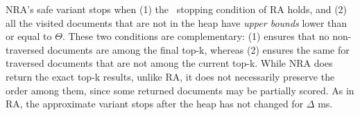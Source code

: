 NRA's safe variant stops when (1) the \RAStop\ stopping condition of RA holds, 
and (2) all the  visited documents that are not in the heap have \emph{upper bounds} lower than or equal to $\Theta$. These two conditions are complementary: (1) ensures that no non-traversed documents are among the final top-k, whereas (2) ensures the same for  traversed documents that are not among the current top-k. 
While NRA does return the exact top-k results, unlike RA, it does not necessarily preserve the order among them, since some returned documents may be partially scored. As in RA, the approximate variant  stops after the heap has not changed for $\Delta$ ms.

